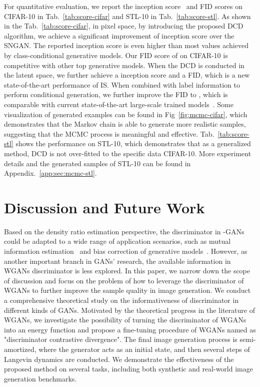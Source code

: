 \documentclass{article}
\begin{document}
For quantitative evaluation, we report the inception score~\cite{salimans2016improved} and FID \cite{heusel2017gans} scores on CIFAR-10 in Tab.~\ref{tab:score-cifar} and STL-10 in Tab.~\ref{tab:score-stl}. As shown in the Tab.~\ref{tab:score-cifar}, in pixel space, by introducing the proposed DCD algorithm, we achieve a significant improvement of inception score over the SNGAN. The reported inception score is even higher than most values achieved by class-conditional generative models. Our FID score of  on CIFAR-10 is competitive with other top generative models. When the DCD is conducted in the latent space, we further achieve a  inception score and a  FID, which is a new state-of-the-art performance of IS. When combined with label information to perform conditional generation, we further improve the FID to , which is comparable with current state-of-the-art large-scale trained models~\cite{brock2018large}. Some visualization of generated examples can be found in Fig~\ref{fig:mcmc-cifar}, which demonstrates that the Markov chain is able to generate more realistic samples, suggesting that the MCMC process is meaningful and effective. Tab.~\ref{tab:score-stl} shows the performance on STL-10, which demonstrates that as a generalized method, DCD is not over-fitted to the specific data CIFAR-10. More experiment details and the generated samples of STL-10 can be found in Appendix.~\ref{app:sec:mcmc-stl}.

\section{Discussion and Future Work}
Based on the density ratio estimation perspective, the discriminator in -GANs could be adapted to a wide range of application scenarios, such as mutual information estimation~\cite{hjelm2018learning} and bias correction of generative models~\cite{grover2019bias}.  However, as another important branch in GANs' research, the available information in WGANs discriminator is less explored. In this paper, we narrow down the scope of discussion and focus on the problem of how to leverage the discriminator of WGANs to further improve the sample quality in image generation. We conduct a comprehensive theoretical study on the informativeness of discriminator in different kinds of GANs. Motivated by the theoretical progress in the literature of WGANs, we investigate the possibility of turning the discriminator of WGANs into an energy function and propose a fine-tuning procedure of WGANs named as "discriminator contrastive divergence". The final image generation process is semi-amortized, where the generator acts as an initial state, and then several steps of Langevin dynamics are conducted.  We demonstrate the effectiveness of the proposed method on several tasks, including both synthetic and real-world image generation benchmarks. 
\end{document}
